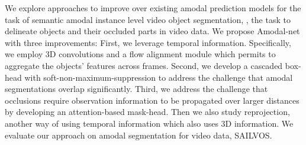 We explore approaches to improve over existing amodal prediction models for the task of semantic amodal instance level video object segmentation, \ie, the task to delineate  objects and their occluded parts in video data. We propose Amodal-net with three improvements: First, we leverage temporal information. Specifically, we employ 3D convolutions and a flow alignment module which permits to aggregate the objects' features across frames. Second, we develop a cascaded box-head with  soft-non-maximum-suppression %
to address the challenge that amodal segmentations overlap significantly. %
Third, we address the challenge that occlusions require observation information to be propagated over larger distances by developing an attention-based mask-head. Then we also study reprojection, another way of using temporal information which also uses 3D information.
We evaluate our approach on amodal segmentation for video data, SAILVOS. 

